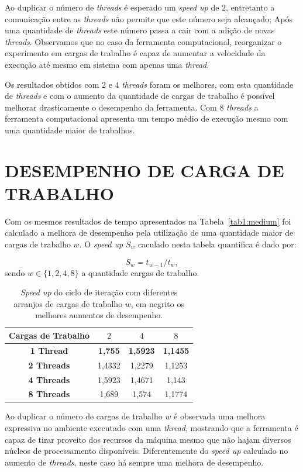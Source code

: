 Ao duplicar o número de \textit{threads} é esperado um \textit{speed up} de $2$, entretanto a comunicação entre as \textit{threads} não permite que este número seja alcançado; Após uma quantidade de \textit{threads} este número passa a cair com a adição de novas \textit{threads}. Observamos que no caso da ferramenta computacional, reorganizar o experimento em cargas de trabalho é capaz de aumentar a velocidade da execução até mesmo em sistema com apenas uma \textit{thread}.

Os resultados obtidos com $2$ e $4$ \textit{threads} foram os melhores, com esta quantidade de \textit{threads} e com o aumento da quantidade de cargas de trabalho é possível melhorar drasticamente o desempenho da ferramenta. Com $8$ \textit{threads} a ferramenta computacional apresenta um tempo médio de execução mesmo com uma quantidade maior de trabalhos.

\section{DESEMPENHO DE CARGA DE TRABALHO}\label{sec:cenario5}

Com os mesmos resultados de tempo apresentados na Tabela~\ref{tab1:medium} foi calculado a melhora de desempenho pela utilização de uma quantidade maior de cargas de trabalho $w$. O \textit{speed up} $S_w$ caculado nesta tabela quantifica é dado por:

\begin{equation}
	S_w = t_{w-1}/t_{w},
	\label{eq:speedup2}
\end{equation}
sendo $w \in \{1,2,4,8\}$ a quantidade cargas de trabalho.

\begin{table}[!htbp]
\caption{\textit{Speed up} do ciclo de iteração com diferentes arranjos de cargas de trabalho $w$, em negrito os melhores aumentos de desempenho.}
\centering{}
\begin{tabular}{c|c|c|c}
	\toprule 
	\textbf{Cargas de Trabalho} & $2$ & $4$  & $8$\\ 
	\midrule 
	\textbf{1 Thread} & \textbf{1,755} &	\textbf{1,5923} &	\textbf{1,1455} \\ 
	\midrule 
	\textbf{2 Threads} & 1,4332 &	1,2279 & 1,1253\\ 
	\midrule 
	\textbf{4 Threads} & 1,5923 &	1,4671 &	1,143\\ 
	\midrule 
	\textbf{8 Threads} & 1,689 &	1,574 & 1,1774	\\ 
	\bottomrule 
\end{tabular} 
\label{tab1:speedup2}
\end{table}

Ao duplicar o número de cargas de trabalho $w$ é observada uma melhora expressiva no ambiente executado com uma \textit{thread}, mostrando que a ferramenta é capaz de tirar proveito dos recursos da máquina mesmo que não hajam diversos núcleos de processamento disponíveis. Diferentemente do \textit{speed up} calculado no aumento de \textit{threads}, neste caso há sempre uma melhora de desempenho.